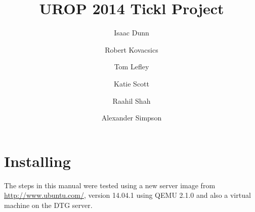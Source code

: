 \documentclass[12pt,a4paper]{article}
\title{\vspace{-48pt}
  UROP 2014 Tickl Project
}
\author{Isaac Dunn
  \and Robert Kovacsics
  \and Tom Lefley
  \and Katie Scott
  \and Raahil Shah
  \and Alexander Simpson
}
\begin{document}
\maketitle
\section{Installing}
The steps in this manual were tested using a new server image from \url{http://www.ubuntu.com/}, version 14.04.1 using QEMU 2.1.0 and also a virtual machine on the DTG server.
\end{document}
